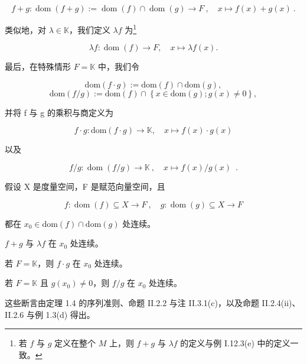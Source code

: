 \[
f+g\colon\operatorname{d o m}(f+g):=\operatorname{d o m}(f)\cap\operatorname{d o m}(g)\to F~,\quad x\mapsto f(x)+g(x)~.
\]

类似地，对 $ \lambda \in \mathbb{K} $，我们定义 $ \lambda f $ 为\footnote{若 $ f $ 与 $ g $ 定义在整个 $ M $ 上，则 $ f + g $ 与 $ \lambda f $ 的定义与例 I.12.3(e) 中的定义一致。}

\[
\lambda f:\operatorname{dom}(f)\to F,\quad x\mapsto\lambda f(x).
\]

最后，在特殊情形 $F = \mathbb{K}$ 中，我们令

\[
\mathrm{dom}(f\cdot g):=\mathrm{dom}(f)\cap\mathrm{dom}(g),
\]
\[
\mathrm{dom}(f/g):=\mathrm{dom}(f)\cap\left\{x\in\mathrm{dom}(g);g(x)\neq0\right\},
\]

并将 f 与 g 的乘积与商定义为

\[
f\cdot g:\mathrm{dom}(f\cdot g)\to\mathbb{K},\quad x\mapsto f(x)\cdot g(x)
\]

以及

\[
f/g\colon\operatorname{d o m}(f/g)\to\mathbb{K}~,\quad x\mapsto f(x)/g(x)\enspace.
\]

\begin{proposition}

假设 X 是度量空间，F 是赋范向量空间，且

\[
f:\operatorname{dom}(f)\subseteq X\to F~,\quad g:\operatorname{dom}(g)\subseteq X\to F
\]

都在 $ x_0 \in \mathrm{dom}(f) \cap \mathrm{dom}(g) $ 处连续。

\begin{subitems}
\item

$ f + g $ 与 $ \lambda f $ 在 $ x_{0} $ 处连续。

\item

若 $ F = \mathbb{K} $，则 $ f \cdot g $ 在 $ x_0 $ 处连续。

\item

若 $ F = \mathbb{K} $ 且 $ g(x_0) \neq 0 $，则 $ f/g $ 在 $ x_0 $ 处连续。

\proofhead
这些断言由定理 1.4 的序列准则、命题 II.2.2 与注 II.3.1(c)，以及命题 II.2.4(ii)、II.2.6 与例 1.3(d) 得出。
\end{subitems}

\end{proposition}

